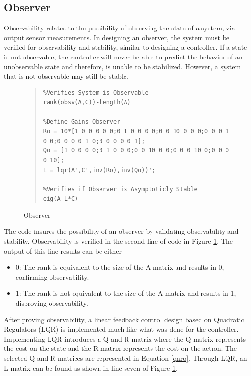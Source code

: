 \documentclass[12pt]{article}
\begin{document}
\subsection{Observer}
Observability relates to the possibility of observing the state of a system, via output sensor measurements. In designing an observer, the system must be verified for observability and stability, similar to designing a controller. If a state is not observable, the controller will never be able to predict the behavior of an unobservable state and therefore, is unable to be stabilized. However, a system that is not observable may still be stable.
\begin{figure}[!h]
\begin{quote}
\begin{lstlisting}
%Verifies System is Observable
rank(obsv(A,C))-length(A)

%Define Gains Observer
Ro = 10*[1 0 0 0 0 0;0 1 0 0 0 0;0 0 10 0 0 0;0 0 0 1 0 0;0 0 0 0 1 0;0 0 0 0 0 1];
Qo = [1 0 0 0 0;0 1 0 0 0;0 0 10 0 0;0 0 0 10 0;0 0 0 0 10];
L = lqr(A',C',inv(Ro),inv(Qo))';

%Verifies if Observer is Asymptoticly Stable
eig(A-L*C)
\end{lstlisting}
\end{quote}
\caption{Observer\label{fig:obsv}}
\end{figure}
The code insures the possibility of an observer by validating observability and stability. Observability is verified in the second line of code in Figure \ref{fig:obsv}. The output of this line results can be either
\begin{itemize}
\item 0: The rank is equivalent to the size of the A matrix and results in 0, confirming observability.
\item 1: The rank is not equivalent to the size of the A matrix and results in 1, disproving observability. 
\end{itemize}
After proving observability, a linear feedback control design based on Quadratic Regulators (LQR) is implemented much like what was done for the controller. Implementing LQR introduces a Q and R matrix where the Q matrix represents the cost on the state and the R matrix represents the cost on the action. The selected Q and R matrices are represented in Equation \eqref{qnro}. Through LQR, an L matrix can be found as shown in line seven of Figure \ref{fig:obsv}.
\\ \\
\end{document}
